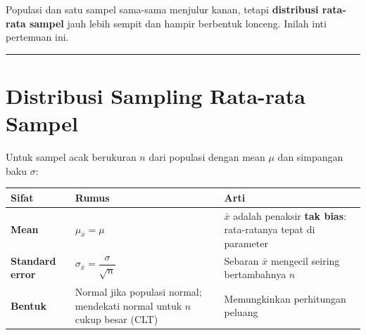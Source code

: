\documentclass[
  indonesian,
  letterpaper,
]{book}
\newcounter{none} %
\begin{document}
Populasi dan satu sampel sama-sama menjulur kanan, tetapi
\textbf{distribusi rata-rata sampel} jauh lebih sempit dan hampir
berbentuk lonceng. Inilah inti pertemuan ini.

\begin{center}\rule{0.5\linewidth}{0.5pt}\end{center}


\chapter{Distribusi Sampling Rata-rata
Sampel}\label{distribusi-sampling-rata-rata-sampel}

Untuk sampel acak berukuran \(n\) dari populasi dengan mean \(\mu\) dan
simpangan baku \(\sigma\):

{\def\LTcaptype{none} %
\begin{longtable}[]{@{}
  >{\raggedright\arraybackslash}p{}
  >{\raggedright\arraybackslash}p{}
  >{\raggedright\arraybackslash}p{}@{}}
\toprule\noalign{}
\begin{minipage}[b]{\linewidth}\raggedright
Sifat
\end{minipage} & \begin{minipage}[b]{\linewidth}\raggedright
Rumus
\end{minipage} & \begin{minipage}[b]{\linewidth}\raggedright
Arti
\end{minipage} \\
\midrule\noalign{}
\endhead
\bottomrule\noalign{}
\endlastfoot
\textbf{Mean} & \(\mu_{\bar{x}} = \mu\) & \(\bar{x}\) adalah penaksir
\textbf{tak bias}: rata-ratanya tepat di parameter \\
\textbf{Standard error} &
\(\sigma_{\bar{x}} = \dfrac{\sigma}{\sqrt{n}}\) & Sebaran \(\bar{x}\)
mengecil seiring bertambahnya \(n\) \\
\textbf{Bentuk} & Normal jika populasi normal; mendekati normal untuk
\(n\) cukup besar (CLT) & Memungkinkan perhitungan peluang \\
\end{longtable}
}
\end{document}

